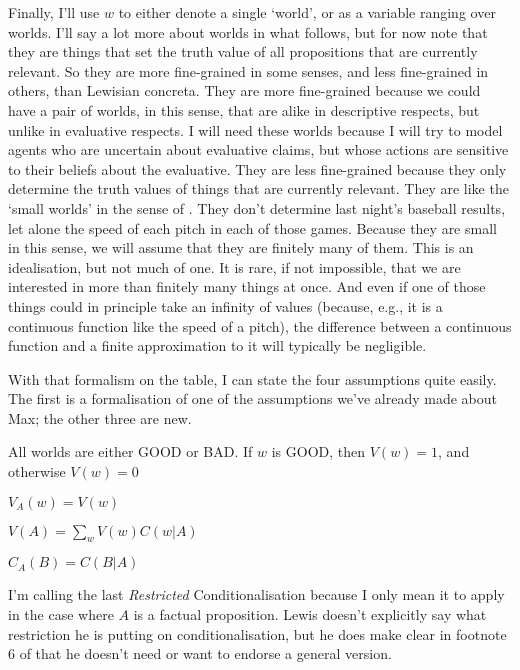 \documentclass[11pt,]{book}
\providecommand{\tightlist}{%
  \setlength{\itemsep}{0pt}\setlength{\parskip}{0pt}}
\begin{document}
Finally, I'll use \(w\) to either denote a single `world', or as a variable ranging over worlds. I'll say a lot more about worlds in what follows, but for now note that they are things that set the truth value of all propositions that are currently relevant. So they are more fine-grained in some senses, and less fine-grained in others, than Lewisian concreta. They are more fine-grained because we could have a pair of worlds, in this sense, that are alike in descriptive respects, but unlike in evaluative respects. I will need these worlds because I will try to model agents who are uncertain about evaluative claims, but whose actions are sensitive to their beliefs about the evaluative. They are less fine-grained because they only determine the truth values of things that are currently relevant. They are like the `small worlds' in the sense of \citet{Savage1954}. They don't determine last night's baseball results, let alone the speed of each pitch in each of those games. Because they are small in this sense, we will assume that they are finitely many of them. This is an idealisation, but not much of one. It is rare, if not impossible, that we are interested in more than finitely many things at once. And even if one of those things could in principle take an infinity of values (because, e.g., it is a continuous function like the speed of a pitch), the difference between a continuous function and a finite approximation to it will typically be negligible.

With that formalism on the table, I can state the four assumptions quite easily. The first is a formalisation of one of the assumptions we've already made about Max; the other three are new.

\begin{description}
\tightlist
\item[Good-Bad]
All worlds are either GOOD or BAD. If \(w\) is GOOD, then \(V(w) = 1\), and otherwise \(V(w) = 0\)
\item[Invariance]
\(V_A(w) = V(w)\)
\item[Additivity]
\(V(A) = \sum_w V(w)C(w | A)\)
\item[Restricted Conditionalisation]
\(C_A(B) = C(B | A)\)
\end{description}

I'm calling the last \emph{Restricted} Conditionalisation because I only mean it to apply in the case where \(A\) is a factual proposition. Lewis doesn't explicitly say what restriction he is putting on conditionalisation, but he does make clear in footnote 6 of \citeyearpar{Lewis1996} that he doesn't need or want to endorse a general version.
\end{document}
